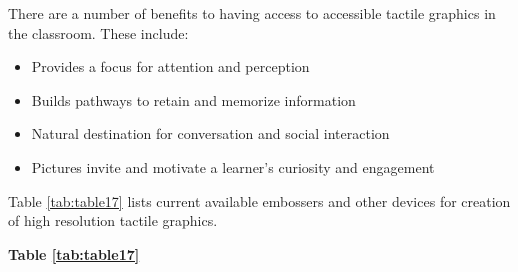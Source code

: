 \documentclass[12pt,letterpaper,twoside,openright]{report}
\begin{document}
There are a number of benefits to having access to accessible tactile graphics in the classroom. These include:
\begin{itemize}[leftmargin=*]
	\item Provides a focus for attention and perception
	\item Builds pathways to retain and memorize information
	\item Natural destination for conversation and social interaction
	\item Pictures invite and motivate a learner's curiosity and engagement
\end{itemize}
Table \ref{tab:table17} lists current available embossers and other devices for creation of high resolution tactile graphics.


\pagebreak 
\large\textbf{Table \ref{tab:table17}}\normalfont 
\end{document}
